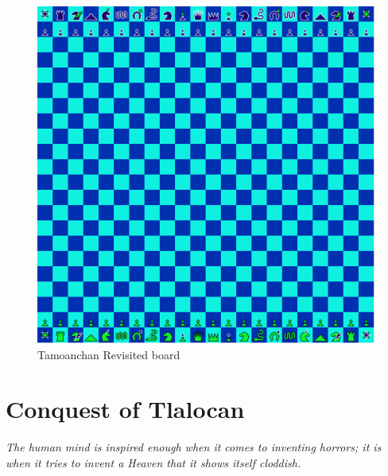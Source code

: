 \documentclass[a5paper,12pt,draft]{book} %
\begin{document}
\noindent
\begin{figure}[h]
\includegraphics[width=1.0\textwidth, keepaspectratio=true]{../gfx/boards/16_tamoanchan_revisited.png}
\caption{Tamoanchan Revisited board}
\label{fig:tamoanchan_revisited}
\end{figure}

\clearpage

\chapter*{Conquest of Tlalocan}

\begin{flushright}
\parbox{0.8\textwidth}{
\emph{The human mind is inspired enough when it comes to inventing
horrors; it is when it tries to invent a Heaven that it shows itself
cloddish. \\
 } }
\end{flushright}
\end{document}
